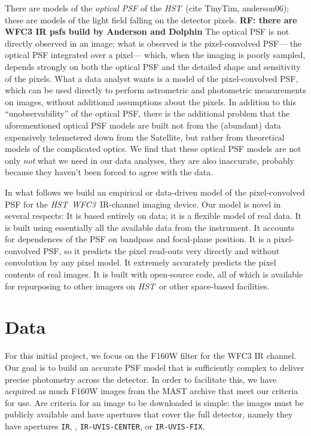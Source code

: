 \documentclass[12pt,letterpaper,preprint]{aastex}
\newcommand{\instrument}[1]{\textsl{#1}}
\newcommand{\rf}[1]{\textbf{RF: #1}}
\newcommand{\HST}{\instrument{HST}}
\newcommand{\WFC}{\instrument{WFC3}}
\begin{document}
There are models of the \emph{optical PSF} of the \HST\ (cite TinyTim, anderson06);
  these are models of the light field falling on the detector pixels. \rf{there are WFC3 IR psfs build by Anderson and Dolphin}
The optical PSF is not directly observed in an image;
  what is observed is the pixel-convolved PSF---%
  the optical PSF integrated over a pixel---%
  which, when the imaging is poorly sampled,
  depends strongly on both the optical PSF
  and the detailed shape and sensitivity of the pixels.
What a data analyst wants is a model of the pixel-convolved PSF,
  which can be used directly to perform astrometric and photometric measurements on images,
  without additional assumptions about the pixels.
In addition to this ``unobservability'' of the optical PSF,
  there is the additional problem that the aforementioned optical PSF models
  are built not from the (abundant) data expensively telemetered down from the Satellite,
  but rather from theoretical models of the complicated optics.
We find that these optical PSF models are not only \emph{not} what we need in our data analyses,
  they are also inaccurate, probably because they haven't been forced to agree with the data.

In what follows we build an empirical or data-driven model
  of the pixel-convolved PSF for the \HST\ \WFC\ IR-channel imaging device.
Our model is novel in several respects:
It is based entirely on data;
  it is a flexible model of real data.
It is built using essentially all the available data from the instrument.
It accounts for dependences of the PSF on bandpass and focal-plane position.
It is a pixel-convolved PSF,
  so it predicts the pixel read-outs very directly and without convolution by any pixel model.
It extremely accurately predicts the pixel contents of real images.
It is built with open-source code,
  all of which is available for repurposing to other imagers on \HST\ or other space-based facilities.

\section{Data}

For this initial project, we focus on the F160W filter for the WFC3 IR channel.  Our goal is to build 
an accurate PSF model that is sufficiently complex to deliver precise photometry across the 
detector.  In order to facilitate this, we have acquired as much F160W images from the MAST 
archive that meet our criteria for use.  Are criteria for an image to be downloaded is simple: the 
images must be publicly available and have apertures that cover the full detector, namely they 
have apertures \texttt{IR}, , \texttt{IR-UVIS-CENTER}, or \texttt{IR-UVIS-FIX}.
\end{document}
